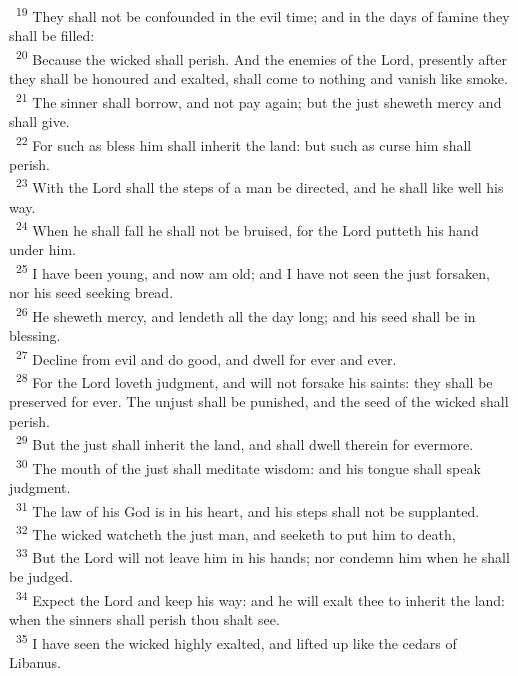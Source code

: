 \documentclass[a5paper,12pt]{article}
\begin{document}
\begin{multicols*}{2}
~\textsuperscript{19} They shall not be confounded in the evil time; and in the days of famine they shall be filled:\\
~\textsuperscript{20} Because the wicked shall perish. And the enemies of the Lord, presently after they shall be honoured and exalted, shall come to nothing and vanish like smoke.\\
~\textsuperscript{21} The sinner shall borrow, and not pay again; but the just sheweth mercy and shall give.\\
~\textsuperscript{22} For such as bless him shall inherit the land: but such as curse him shall perish.\\
~\textsuperscript{23} With the Lord shall the steps of a man be directed, and he shall like well his way.\\
~\textsuperscript{24} When he shall fall he shall not be bruised, for the Lord putteth his hand under him.\\
~\textsuperscript{25} I have been young, and now am old; and I have not seen the just forsaken, nor his seed seeking bread.\\
~\textsuperscript{26} He sheweth mercy, and lendeth all the day long; and his seed shall be in blessing.\\
~\textsuperscript{27} Decline from evil and do good, and dwell for ever and ever.\\
~\textsuperscript{28} For the Lord loveth judgment, and will not forsake his saints: they shall be preserved for ever. The unjust shall be punished, and the seed of the wicked shall perish.\\
~\textsuperscript{29} But the just shall inherit the land, and shall dwell therein for evermore.\\
~\textsuperscript{30} The mouth of the just shall meditate wisdom: and his tongue shall speak judgment.\\
~\textsuperscript{31} The law of his God is in his heart, and his steps shall not be supplanted.\\
~\textsuperscript{32} The wicked watcheth the just man, and seeketh to put him to death,\\
~\textsuperscript{33} But the Lord will not leave him in his hands; nor condemn him when he shall be judged.\\
~\textsuperscript{34} Expect the Lord and keep his way: and he will exalt thee to inherit the land: when the sinners shall perish thou shalt see.\\
~\textsuperscript{35} I have seen the wicked highly exalted, and lifted up like the cedars of Libanus.\\

\end{multicols*}
\end{document}
